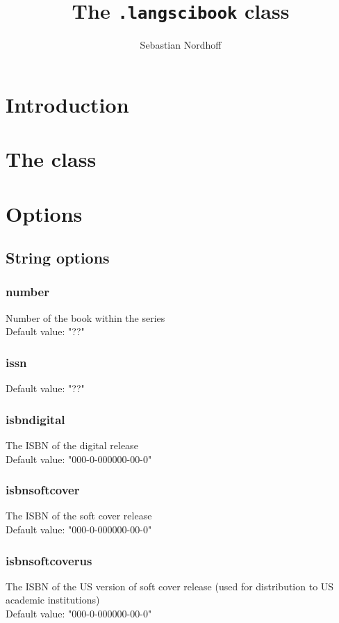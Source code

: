 \documentclass[guidelines]{langscibook}
\author{Sebastian Nordhoff}
\title{The \texttt{.langscibook} \latex class}
\begin{document}
\maketitle

\frontmatter
{} %
\tableofcontents
% 
% 
%  

\mainmatter       
\section{Introduction}
\section{The class}
\section{Options}
\subsection{String options}
\subsubsection{number}
Number of the book within the series\\
Default value: "??"
\subsubsection{issn}
Default value: "??"
\subsubsection{isbndigital}
The ISBN of the digital release\\
Default value: "000-0-000000-00-0"
\subsubsection{isbnsoftcover}
The ISBN of the soft cover release\\
Default value: "000-0-000000-00-0"
\subsubsection{isbnsoftcoverus}
The ISBN of the US version of soft cover release (used for distribution to US academic institutions)\\
Default value: "000-0-000000-00-0"
\end{document}
